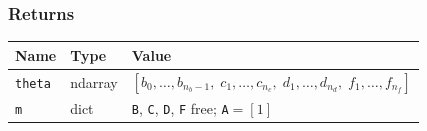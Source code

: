\documentclass[../main]{subfiles}
\begin{document}
\subsubsection*{Returns}
\begin{center}
\begin{tabular}{lll}
  \toprule
  Name & Type & Value \\
  \midrule
  \texttt{theta} & ndarray & $[b_0,\ldots,b_{n_b-1},\; c_1,\ldots,c_{n_c},\;
                              d_1,\ldots,d_{n_d},\; f_1,\ldots,f_{n_f}]$ \\
  \texttt{m}     & dict    & \texttt{B}, \texttt{C}, \texttt{D}, \texttt{F} free;
                             \texttt{A}$=[1]$ \\
  \bottomrule
\end{tabular}
\end{center}
\end{document}
